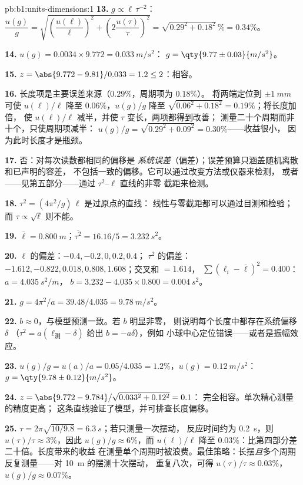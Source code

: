 \begin{solution}{pb:b1:units-dimensions:1}
\textbf{13.} $g \propto \ell\,\tau^{-2}$：
$\dfrac{u(g)}{g} = \sqrt{\left(\dfrac{u(\ell)}{\ell}\right)^2
+ \left(2\dfrac{u(\tau)}{\tau}\right)^2} = \sqrt{0.29^2 + 0.18^2}\,\%
= 0.34\%$。

\textbf{14.} $u(g) = 0.0034 \times 9.772 = \qty{0.033}{m/s^2}$：
$g = \qty{9.77\pm0.03}{m/s^2}$。

\textbf{15.} $z = \abs{9.772 - 9.81}/0.033 = 1.2 \leq 2$：相容。

\textbf{16.} 长度项是主要误差来源（$0.29\%$，周期项为 $0.18\%$）。
将两端定位到 $\pm\qty{1}{mm}$ 可使 $u(\ell)/\ell$ 降至
$0.06\%$，$u(g)/g$ 降至 $\sqrt{0.06^2 + 0.18^2} = 0.19\%$；将长度加倍，
使 $u(\ell)/\ell$ 减半，并使 $\tau$ 变长，两项都得到改善；
测量二十个周期而非十个，只使周期项减半：
$u(g)/g = \sqrt{0.29^2 + 0.09^2} = 0.30\%$——收益很小，
因为此时长度才是瓶颈。

\textbf{17.} 否：对每次读数都相同的偏移是
\emph{系统误差}（偏差）；误差预算只涵盖随机离散和已声明的容差，
不包括一致的偏移。它可以通过改变方法或仪器来检测，
或者——见第五部分——通过 $\tau^2$--$\ell$ 直线的非零
截距来检测。

\textbf{18.} $\tau^2 = (4\pi^2/g)\,\ell$ 是过原点的直线：
线性与零截距都可以通过目测和检验；
而 $\tau \propto \sqrt\ell$ 则不能。

\textbf{19.} $\bar\ell = \qty{0.800}{m}$；$\overline{\tau^2} = 16.16/5 =
\qty{3.232}{s^2}$。

\textbf{20.} $\ell$ 的偏差：$-0.4, -0.2, 0, 0.2, 0.4$；
$\tau^2$ 的偏差：$-1.612, -0.822, 0.018, 0.808, 1.608$；交叉和 $= 1.614$，
$\sum(\ell_i - \bar\ell)^2 = 0.400$：$a = \qty{4.035}{s^2/m}$，
$b = 3.232 - 4.035 \times 0.800 = \qty{0.004}{s^2}$。

\textbf{21.} $g = 4\pi^2/a = 39.48/4.035 = \qty{9.78}{m/s^2}$。

\textbf{22.} $b \approx 0$，与模型预测一致。若 $b$ 明显非零，
则说明每个长度中都存在系统偏移 $\delta$
（$\tau^2 = a(\ell_{\text{测}} - \delta)$ 给出 $b = -a\delta$），例如
小球中心定位错误——或者是振幅效应。

\textbf{23.} $u(g)/g = u(a)/a = 0.05/4.035 = 1.2\%$，$u(g) =
\qty{0.12}{m/s^2}$：$g = \qty{9.78\pm0.12}{m/s^2}$。

\textbf{24.} $z = \abs{9.772 - 9.784}/\sqrt{0.033^2 + 0.12^2} = 0.1$：
完全相容。单次精心测量的精度更高；
这条直线验证了模型，并可排查长度偏移。

\textbf{25.} $\tau = 2\pi\sqrt{10/9.8} = \qty{6.3}{s}$；若只测量一次摆动，
反应时间约为 \qty{0.2}{s}，则 $u(\tau)/\tau \approx
3\%$，因此 $u(g)/g \approx 6\%$，而 $u(\ell)/\ell$ 降至
$0.03\%$：比第四部分差二十倍。长度带来的收益
在测量单个周期时被浪费。最佳策略：长摆\emph{且}多个周期
反复测量——对 \qty{10}{m} 的摆测十次摆动，
重复八次，可得 $u(\tau)/\tau \approx 0.03\%$，$u(g)/g \approx 0.07\%$。
\end{solution}

